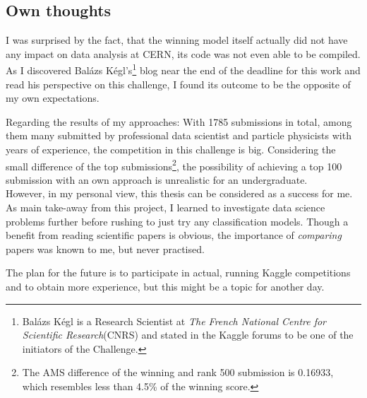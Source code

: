 \subsection{Own thoughts}
I was surprised by the fact, that the winning model itself actually did not have any impact on data analysis at CERN, its code was not even able to be compiled. As I discovered Balázs Kégl's\footnote{Balázs Kégl is a Research Scientist at \emph{The French National Centre for Scientific Research}(CNRS) and stated in the Kaggle forums to be one of the initiators of the Challenge.} blog near the end of the deadline for this work and read his perspective on this challenge, I found its outcome to be the opposite of my own  expectations.

Regarding the results of my approaches: With 1785 submissions in total, among them many submitted by professional data scientist and particle physicists with years of experience, the competition in this challenge is big. Considering the small difference of the top submissions\footnote{The AMS difference of the winning and rank 500 submission  is 0.16933, which resembles less than 4.5\% of the winning score.}, the possibility of achieving a top 100 submission with an own approach is unrealistic for an undergraduate.\\
However, in my personal view, this thesis can be considered as a success for me. As main take-away from this project, I learned to investigate data science problems further before rushing to just try any classification models. Though a benefit from reading scientific papers is obvious, the importance of \emph{comparing} papers was known to me, but never practised.

The plan for the future is to participate in actual, running Kaggle competitions and to obtain more experience, but this might be a topic for another day.
	{\pagebreak \thispagestyle{empty} \cleardoublepage}{\clearpage}